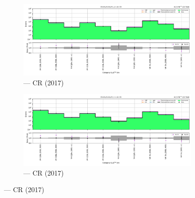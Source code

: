 \begin{figure}[htbp]
    \centering
    \begin{subfigure}[b]{0.49\textwidth}
        \includegraphics[width=\textwidth]{chapters/higgstoinv/figures/mountain_ranges/2017/VH/Wmunu_tree_fit_b-abs_values_VH_cats.pdf}
        \caption{\VH --- \singleMuCr \gls{CR} (2017)}
    \end{subfigure}
    \hfill
    \begin{subfigure}[b]{0.49\textwidth}
        \includegraphics[width=\textwidth]{chapters/higgstoinv/figures/mountain_ranges/2017/VH/Wenu_tree_fit_b-abs_values_VH_cats.pdf}
        \caption{\VH --- \singleEleCr \gls{CR} (2017)}
    \end{subfigure}


\end{figure}

